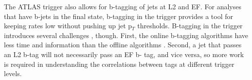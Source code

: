 The ATLAS trigger also allows for b-tagging of jets at L2 and EF.  For analyses that have 
b-jets in the final state, b-tagging in the trigger provides a tool for keeping rates 
low without pushing up jet p$_T$ thresholds.  B-tagging in the trigger introduces several challenges
, though.  First, the online b-tagging algorithms have less time and information than the offline algorithms
.  Second, a jet that passes an L2 b-tag will not necessarily pass an EF b-
tag, and vice versa, so more work is required in understanding the correlations between tags at different trigger 
levels.  








